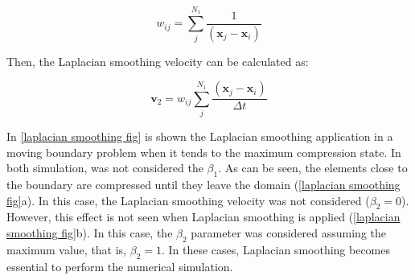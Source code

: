 \begin{equation} \label{laplacian weight}
w_{ij} = \sum_{j}^{N_1}
\frac{1}{\left( \textbf{x}_{j} - \textbf{x}_{i} \right)}
\end{equation}

\medskip
\noindent
Then, the Laplacian smoothing velocity can be calculated as:


\begin{equation}
\textbf{v}_{2}
= w_{ij} \sum_{j}^{N_1}
\frac{\left( \textbf{x}_{j} - \textbf{x}_{i} \right)}{\Delta t}
\end{equation}

\medskip
In \ref{laplacian smoothing fig} is shown 
the Laplacian smoothing application in a moving boundary problem
when it tends to the maximum compression state.
In both simulation, was not considered the $\beta_{1}$.
As can be seen, the elements close to the boundary are compressed 
until they leave the domain (\ref{laplacian smoothing fig}a).
In this case, the Laplacian smoothing velocity was not considered
($\beta_{2} = 0$). 
However, this effect is not seen when 
Laplacian smoothing is applied (\ref{laplacian smoothing fig}b). 
In this case, the $\beta_{2}$ parameter was considered
assuming the maximum value, that is, $\beta_{2} = 1$.
In these cases, Laplacian smoothing becomes essential 
to perform the numerical simulation.


